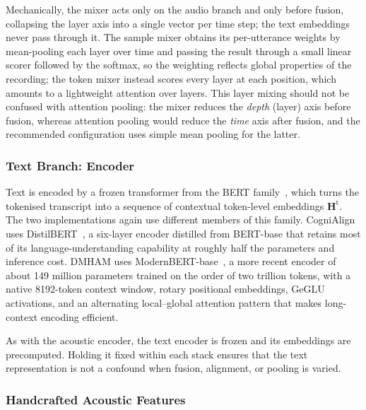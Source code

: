 \documentclass[a4paper,12pt]{article}
\begin{document}
Mechanically, the mixer acts only on the audio branch and only before fusion, collapsing the layer axis into a single vector per time step; the text embeddings never pass through it. The sample mixer obtains its per-utterance weights by mean-pooling each layer over time and passing the result through a small linear scorer followed by the softmax, so the weighting reflects global properties of the recording; the token mixer instead scores every layer at each position, which amounts to a lightweight attention over layers. This layer mixing should not be confused with attention pooling: the mixer reduces the \emph{depth} (layer) axis before fusion, whereas attention pooling would reduce the \emph{time} axis after fusion, and the recommended configuration uses simple mean pooling for the latter.

\subsubsection{Text Branch: Encoder}

Text is encoded by a frozen transformer from the BERT family~\cite{devlin2019bert}, which turns the tokenised transcript into a sequence of contextual token-level embeddings $\mathbf{H}^{\mathrm{t}}$. The two implementations again use different members of this family. CogniAlign uses DistilBERT~\cite{sanh2019distilbert}, a six-layer encoder distilled from BERT-base that retains most of its language-understanding capability at roughly half the parameters and inference cost. DMHAM uses ModernBERT-base~\cite{warner2025modernbert}, a more recent encoder of about 149 million parameters trained on the order of two trillion tokens, with a native 8192-token context window, rotary positional embeddings, GeGLU activations, and an alternating local--global attention pattern that makes long-context encoding efficient.

As with the acoustic encoder, the text encoder is frozen and its embeddings are precomputed. Holding it fixed within each stack ensures that the text representation is not a confound when fusion, alignment, or pooling is varied.

\subsubsection{Handcrafted Acoustic Features}
\end{document}

